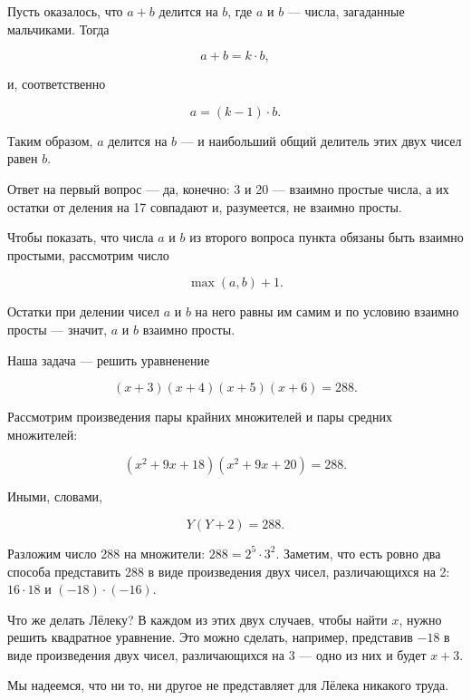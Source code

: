 \begin{itemize}

\itA Пусть оказалось, что $a+b$ делится на $b$, где $a$ и $b$ — числа, загаданные мальчиками. Тогда

\vspace{-0.4cm}
$$a+b = k \cdot b,$$

\noindent и, соответственно

\vspace{-0.4cm}
$$a = (k-1) \cdot b.$$

Таким образом, $a$ делится на $b$ — и наибольший общий делитель этих двух чисел равен $b$.

\itB Ответ на первый вопрос — да, конечно: 3 и 20 — взаимно простые числа, а их остатки от деления на 17 совпадают и, разумеется, не взаимно просты.

Чтобы показать, что числа $a$ и $b$ из второго вопроса пункта обязаны быть взаимно простыми, рассмотрим число

\vspace{-0.4cm}
$$\max (a,b) +1.$$

\noindent Остатки при делении чисел $a$ и $b$ на него равны им самим и по условию взаимно просты — значит, $a$ и $b$ взаимно просты.

\itC Наша задача — решить уравненение

\vspace{-0.4cm}
$$(x+3)(x+4)(x+5)(x+6) = 288.$$

\noindent Рассмотрим произведения пары крайних множителей и пары средних множителей:

\vspace{-0.4cm}
$$(x^2 + 9x + 18)(x^2 + 9x + 20) = 288.$$

Иными, словами,

\vspace{-0.4cm}
$$Y(Y+2) = 288.$$

\noindent Разложим число 288 на множители: $288 = 2^5 \cdot 3^2$. Заметим, что есть ровно два способа представить 288 в виде произведения двух чисел, различающихся на 2: $16 \cdot 18$ и $(-18) \cdot (-16)$.

\ms Что же делать Лёлеку? В каждом из этих двух случаев, чтобы найти $x$, нужно решить квадратное уравнение. Это можно сделать, например, представив $-18$ в виде произведения двух чисел, различающихся на 3 — одно из них и будет $x+3$.

\ms Мы надеемся, что ни то, ни другое не представляет для Лёлека никакого труда.

\end{itemize}
